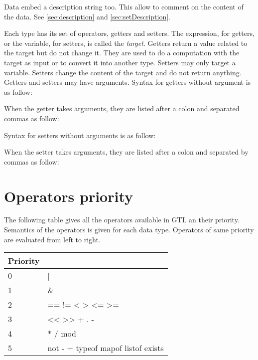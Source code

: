 \documentclass[10pt,openright,twosides,final]{memoir}
\begin{document}
Data embed a description string too. This allow to comment on the content of the data. See \ref{sec:description} and \ref{sec:setDescription}.

Each type has its set of operators, getters and setters. The expression, for getters, or the variable, for setters, is called the {\em target}. Getters return a value related to the target but do not change it. They are used to do a computation with the target as input or to convert it into another type.  Setters may only target a variable. Setters change the content of the target and do not return anything. Getters and setters may have arguments. Syntax for getters without argument is as follow:

\begin{gtl}
\end{gtl}

When the getter takes arguments, they are listed after a colon and separated commas as follow:

\begin{gtl}
\end{gtl}

Syntax for setters without arguments is as follow:

\begin{gtl}
\end{gtl}

When the setter takes arguments, they are listed after a colon and separated by commas as follow:

\begin{gtl}
\end{gtl}

\section{Operators priority}

The following table gives all the operators available in GTL an their priority. Semantics of the operators is given for each data type. Operators of same priority are evaluated from left to right.

\begin{longtable}{l|>{\ttfamily}l}
{\bfseries Priority}&{\bfseries Operators}\\
\hline\endhead
 {0}&
  {| \raisebox{-1mm}{\^{}}}\\
 {1}&
  {\&}\\
 {2}&
  {== != < > <= >=}\\
 {3}&
  {<< >> + . -}\\
 {4}&
  {* / mod}\\
 {5}&
  {not \raisebox{-1mm}{\textasciitilde} - + typeof mapof listof exists}\\
\end{longtable}
\end{document}

